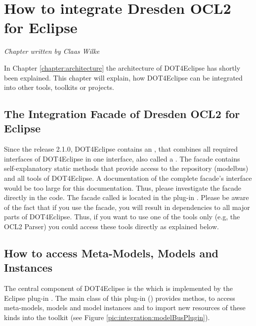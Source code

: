 \chapter{How to integrate Dresden OCL2 for Eclipse}
\label{chapter:integration}

\begin{flushright}
\textit{Chapter written by Claas Wilke}
\end{flushright}

In Chapter \ref{chapter:architecture} the architecture of \acl{DOT4Eclipse} has shortly been explained. This chapter will explain, how \acl{DOT4Eclipse} can be integrated into other tools, toolkits or projects.



\section{The Integration Facade of Dresden OCL2 for Eclipse}

Since the release 2.1.0, \acl{DOT4Eclipse} contains an , that combines all required interfaces of \acl{DOT4Eclipse} in one interface, also called a  \cite{gamma:dp}. The facade contains self-explanatory static methods that provide access to the repository (modelbus) and all tools of \acl{DOT4Eclipse}. A documentation of the complete facade's interface would be too large for this documentation. Thus, please investigate the facade directly in the code. The facade called  is located in the plug-in . Please be aware of the fact that if you use the facade, you will result in dependencies to all major parts of \acl{DOT4Eclipse}. Thus, if you want to use one of the tools only (e.g, the \acs{OCL}2 Parser) you could access these tools directly as explained below.



\section{How to access Meta-Models, Models and Instances}

The central component of \acl{DOT4Eclipse} is the  which is implemented by the Eclipse plug-in . The main class of this plug-in () provides methos, to access meta-models, models and model instances and to import new resources of these kinds into the toolkit (see Figure \ref{pic:integration:modelBusPlugin}).


